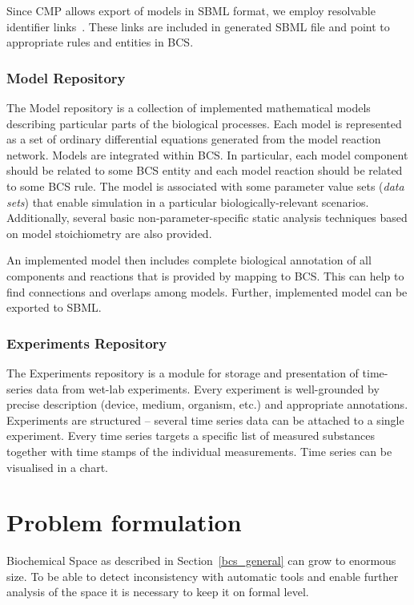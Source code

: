 \documentclass[12pt, twoside]{fithesis2} %
\begin{document}
Since CMP allows export of models in SBML format, we employ resolvable identifier links~\cite{juty2011identifiers}. These links are included in generated SBML file and point to appropriate rules and entities in BCS.

\subsection{Model Repository}
\label{model}

The Model repository is a collection of implemented mathematical models describing particular parts of the biological processes. Each model is represented as a set of ordinary differential equations generated from the model reaction network. Models are integrated within BCS. In particular, each model component should be related to some BCS entity and each model reaction should be related to some BCS rule. The model is associated with some parameter value sets (\emph{data sets}) that enable simulation in a particular biologically-relevant scenarios. Additionally, several basic non-parameter-specific static analysis techniques based on model stoichiometry are also provided.

An implemented model then includes complete biological annotation of all components and reactions that is provided by mapping to BCS. This can help to find connections and overlaps among models. Further, implemented model can be exported to SBML.

\subsection{Experiments Repository}

The Experiments repository is a module for storage and presentation of time-series data from wet-lab experiments. Every experiment is well-grounded by precise description (device, medium, organism, etc.) and appropriate annotations. Experiments are structured -- several time series data can be attached to a single experiment. Every time series targets a specific list of measured substances together with time stamps of the individual measurements. Time series can be visualised in a chart.	

\chapter{Problem formulation}
\label{problem_formulation}

Biochemical Space as described in Section~\ref{bcs_general} can grow to enormous size. To be able to detect inconsistency with automatic tools and enable further analysis of the space it is necessary to keep it on formal level.
\end{document}
